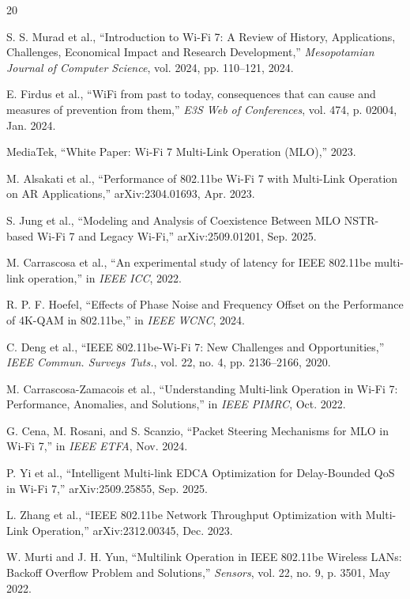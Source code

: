 \documentclass[conference]{IEEEtran}
\begin{document}
\begin{thebibliography}{20}

S. S. Murad et al., ``Introduction to Wi-Fi 7: A Review of History, Applications, Challenges, Economical Impact and Research Development,'' \textit{Mesopotamian Journal of Computer Science}, vol. 2024, pp. 110--121, 2024.

E. Firdus et al., ``WiFi from past to today, consequences that can cause and measures of prevention from them,'' \textit{E3S Web of Conferences}, vol. 474, p. 02004, Jan. 2024.

MediaTek, ``White Paper: Wi-Fi 7 Multi-Link Operation (MLO),'' 2023.

M. Alsakati et al., ``Performance of 802.11be Wi-Fi 7 with Multi-Link Operation on AR Applications,'' arXiv:2304.01693, Apr. 2023.

S. Jung et al., ``Modeling and Analysis of Coexistence Between MLO NSTR-based Wi-Fi 7 and Legacy Wi-Fi,'' arXiv:2509.01201, Sep. 2025.

M. Carrascosa et al., ``An experimental study of latency for IEEE 802.11be multi-link operation,'' in \textit{IEEE ICC}, 2022.

R. P. F. Hoefel, ``Effects of Phase Noise and Frequency Offset on the Performance of 4K-QAM in 802.11be,'' in \textit{IEEE WCNC}, 2024.

C. Deng et al., ``IEEE 802.11be-Wi-Fi 7: New Challenges and Opportunities,'' \textit{IEEE Commun. Surveys Tuts.}, vol. 22, no. 4, pp. 2136--2166, 2020.

M. Carrascosa-Zamacois et al., ``Understanding Multi-link Operation in Wi-Fi 7: Performance, Anomalies, and Solutions,'' in \textit{IEEE PIMRC}, Oct. 2022.

G. Cena, M. Rosani, and S. Scanzio, ``Packet Steering Mechanisms for MLO in Wi-Fi 7,'' in \textit{IEEE ETFA}, Nov. 2024.

P. Yi et al., ``Intelligent Multi-link EDCA Optimization for Delay-Bounded QoS in Wi-Fi 7,'' arXiv:2509.25855, Sep. 2025.

L. Zhang et al., ``IEEE 802.11be Network Throughput Optimization with Multi-Link Operation,'' arXiv:2312.00345, Dec. 2023.

W. Murti and J. H. Yun, ``Multilink Operation in IEEE 802.11be Wireless LANs: Backoff Overflow Problem and Solutions,'' \textit{Sensors}, vol. 22, no. 9, p. 3501, May 2022.


\end{thebibliography}
\end{document}

